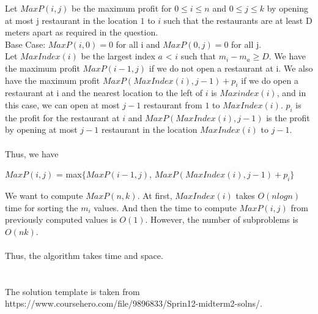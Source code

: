 \documentclass[11pt]{article}
\begin{document}
\begin{solution}
	\mbox{}

Let $MaxP(i,j)$ be the maximum profit for  $0 \leq i \leq n$ and $0 \leq j \leq k$ by opening at most j restaurant in the location $1$ to $i$ such that the restaurants are at least D meters apart as required in the question.\\
Base Case: $MaxP(i,0) = 0$ for all i and $MaxP(0,j) = 0$ for all j. \\
Let $MaxIndex(i)$ be the largest index $a$ < $i$ such that $m_i - m_a \geq D$. We have the maximum profit $MaxP(i-1, j)$ if we do not open a restaurant at i. We also have the maximum profit $MaxP(MaxIndex(i), j-1) + p_i$ if we do open a restaurant at i and the nearest location to the left of $i$ is $Maxindex(i)$, and in this case, we can open at most $j-1$ restaurant from $1$ to $MaxIndex(i)$. $p_i$ is the profit for the restaurant at $i$ and $MaxP(MaxIndex(i), j-1)$ is the profit by opening at most $j-1$ restaurant in the location $MaxIndex(i)$ to $j-1$.\\
\\
Thus, we have
\begin{center}
	$MaxP(i,j)$ = max$\{$$MaxP(i-1, j)$, $MaxP(MaxIndex(i), j-1) + p_i$$\}$
\end{center}
We want to compute $MaxP(n, k)$. At first, $MaxIndex(i)$ takes $O(nlogn)$ time for sorting the $m_i$ values. And then the time to compute $MaxP(i,j)$ from previously computed values is $O(1)$. However, the number of subproblems is $O(nk)$.\\
\\
Thus, the algorithm takes  time and  space.
\\
\\
\\
The solution template is taken from https://www.coursehero.com/file/9896833/Sprin12-midterm2-solns/.

\end{solution}
\end{document}

